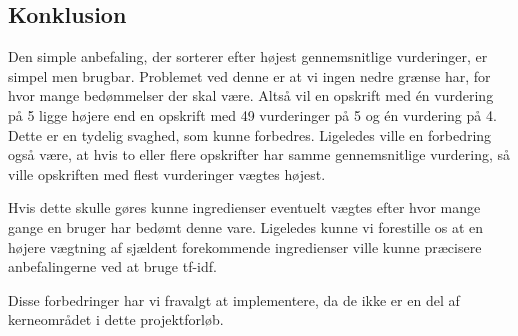 \subsection{Konklusion}
Den simple anbefaling, der sorterer efter højest gennemsnitlige vurderinger, er simpel men brugbar.
Problemet ved denne er at vi ingen nedre grænse har, for hvor mange bedømmelser der skal være.
Altså vil en opskrift med én vurdering på 5 ligge højere end en opskrift med 49 vurderinger på 5 og én vurdering på 4.
Dette er en tydelig svaghed, som kunne forbedres.
Ligeledes ville en forbedring også være, at hvis to eller flere opskrifter har samme gennemsnitlige vurdering, så ville opskriften med flest vurderinger vægtes højest.

Hvis dette skulle gøres kunne ingredienser eventuelt vægtes efter hvor mange gange en bruger har bedømt denne vare.
Ligeledes kunne vi forestille os at en højere vægtning af sjældent forekommende ingredienser ville kunne præcisere anbefalingerne ved at bruge tf-idf.

Disse forbedringer har vi fravalgt at implementere, da de ikke er en del af kerneområdet i dette projektforløb.
